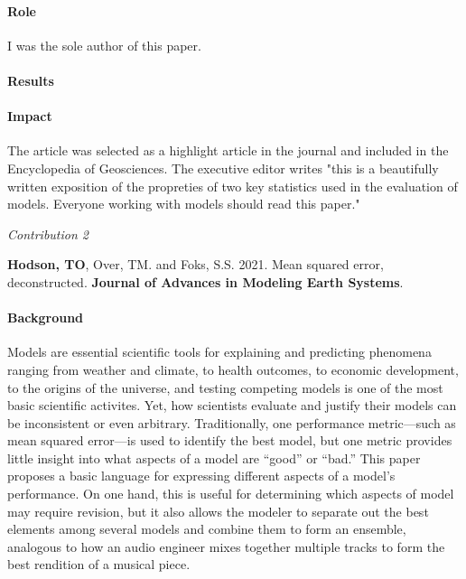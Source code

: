 \documentclass[12pt]{article}
\begin{document}
\paragraph{Role}
I was the sole author of this paper.

\paragraph{Results} 

\paragraph{Impact} 
The article was selected as a highlight article in the journal and
included in the Encyclopedia of Geosciences.
The executive editor writes "this is a beautifully written exposition of the propreties
of two key statistics used in the evaluation of models. Everyone working with models
should read this paper."


\vspace{10pt}
\raggedright \textit{Contribution 2} \\
\vspace{10pt}

\textbf{Hodson, TO}, Over, TM. and Foks, S.S. 2021.
Mean squared error, deconstructed.
\textbf{Journal of Advances in Modeling Earth Systems}. %

\paragraph{Background}
Models are essential scientific tools for explaining and predicting phenomena
ranging from weather and climate, to health outcomes, to economic development,
to the origins of the universe, and testing competing models is one of the most
basic scientific activites.
Yet, how scientists evaluate and justify their models can be inconsistent or even arbitrary.
Traditionally, one performance metric—such as mean squared error—is used to identify the best model, 
but one metric provides little insight into what aspects of a model are “good” or “bad.” 
This paper proposes a basic language for expressing different aspects of a model's performance. 
On one hand, this is useful for determining which aspects of model may require revision, 
but it also allows the modeler to separate out the best elements among several models and combine them to form an ensemble, 
analogous to how an audio engineer mixes together multiple tracks to form the best rendition of a musical piece.
\end{document}
